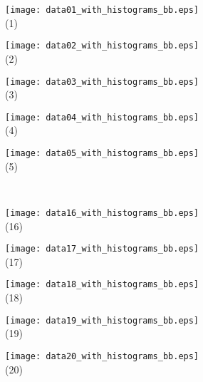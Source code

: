 \documentclass[journal]{vgtc}                %
\begin{document}
\begin{figure*}[ht!]
    \centering

  \begin{minipage}{0.19\textwidth}
   \centering
     \texttt{[image: data01\_with\_histograms\_bb.eps]}\\
     \footnotesize (1)
  \end{minipage}
  \hfill
  \begin{minipage}{0.19\textwidth}
   \centering
     \texttt{[image: data02\_with\_histograms\_bb.eps]}\\
     \footnotesize (2)
  \end{minipage}
  \hfill
  \begin{minipage}{0.19\textwidth}
   \centering
     \texttt{[image: data03\_with\_histograms\_bb.eps]}\\
     \footnotesize (3)
  \end{minipage}
  \hfill
  \begin{minipage}{0.19\textwidth}
   \centering
     \texttt{[image: data04\_with\_histograms\_bb.eps]}\\
     \footnotesize (4)
  \end{minipage}
  \hfill
  \begin{minipage}{0.19\textwidth}
   \centering
     \texttt{[image: data05\_with\_histograms\_bb.eps]}\\
     \footnotesize (5)
  \end{minipage}

    \mbox{} \\ \smallskip

  \begin{minipage}{0.19\textwidth}
   \centering
     \texttt{[image: data16\_with\_histograms\_bb.eps]}\\
     \footnotesize (16)
  \end{minipage}
  \hfill
  \begin{minipage}{0.19\textwidth}
   \centering
     \texttt{[image: data17\_with\_histograms\_bb.eps]}\\
     \footnotesize (17)
  \end{minipage}
  \hfill
  \begin{minipage}{0.19\textwidth}
   \centering
     \texttt{[image: data18\_with\_histograms\_bb.eps]}\\
     \footnotesize (18)
  \end{minipage}
  \hfill
  \begin{minipage}{0.19\textwidth}
   \centering
     \texttt{[image: data19\_with\_histograms\_bb.eps]}\\
     \footnotesize (19)
  \end{minipage}
  \hfill
  \begin{minipage}{0.19\textwidth}
   \centering
     \texttt{[image: data20\_with\_histograms\_bb.eps]}\\
     \footnotesize (20)
  \end{minipage}
  

\end{figure*}
\end{document}
